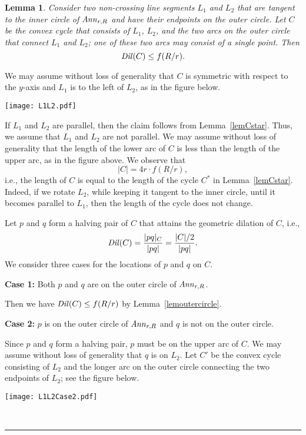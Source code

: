 \documentclass[12pt]{article}
\newtheorem{lemma}{Lemma}
\newcommand{\Ann}{\mathord{\it Ann}}
\newcommand{\Dil}{\mathord{\it Dil}}
\newcommand{\qed}{\rule{0.5em}{1.5ex}}
\newcommand{\fqed}{{\hfill~\qed}}
\newenvironment{proof}{{\noindent \bf Proof.}}
                      {{\hfill \fqed} \vspace{1em}}
\begin{document}
\begin{lemma}   \label{lemtwo}  
Consider two non-crossing line segments $L_1$ and $L_2$ that are tangent 
to the inner circle of $\Ann_{r,R}$ and have their endpoints on the outer 
circle. Let $C$ be the convex cycle that consists of $L_1$, $L_2$, 
and the two arcs on the outer circle that connect $L_1$ and $L_2$; 
one of these two arcs may consist of a single point. Then 
\[ \Dil(C) \leq f(R/r) .
\]  
\end{lemma} 
\begin{proof}  
We may assume without loss of generality that $C$ is symmetric with 
respect to the $y$-axis and $L_1$ is to the left of $L_2$, as in the 
figure below. 

\begin{center}
   \texttt{[image: L1L2.pdf]}
\end{center}

If $L_1$ and $L_2$ are parallel, then the claim follows from 
Lemma~\ref{lemCstar}. Thus, we assume that $L_1$ and $L_2$ are not 
parallel. We may assume without loss of generality that the length of 
the lower arc of $C$ is less than the length of the upper arc, as 
in the figure above. We observe that 
\[ | C | = 4r \cdot f(R/r) , 
\] 
i.e., the length of $C$ is equal to the length of the cycle $C^*$ in 
Lemma~\ref{lemCstar}. Indeed, if we rotate $L_2$, while keeping it 
tangent to the inner circle, until it becomes parallel to $L_1$, then 
the length of the cycle does not change. 

Let $p$ and $q$ form a halving pair of $C$ that attains the geometric 
dilation of $C$, i.e., 
\[ \Dil(C) = \frac{|pq|_C}{|pq|} = \frac{|C|/2}{|pq|} . 
\]  
We consider three cases for the locations of $p$ and $q$ on $C$. 

\vspace{0.5em} 

\noindent 
{\bf Case 1:} Both $p$ and $q$ are on the outer circle of $\Ann_{r,R}$. 

Then we have $\Dil(C) \leq f(R/r)$ by Lemma~\ref{lemoutercircle}. 

\vspace{0.5em} 

\noindent 
{\bf Case 2:} $p$ is on the outer circle of $\Ann_{r,R}$ and $q$ is not 
on the outer circle. 

Since $p$ and $q$ form a halving pair, $p$ must be on the upper arc of 
$C$. We may assume without loss of generality that $q$ is on $L_2$.  
Let $C'$ be the convex cycle consisting of $L_2$ and the longer arc 
on the outer circle connecting the two endpoints of $L_2$; see the 
figure below.  
\begin{center}
   \texttt{[image: L1L2Case2.pdf]}
\end{center}


\end{proof}
\end{document}

